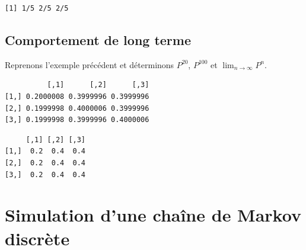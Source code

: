 \documentclass[
]{book}
\newenvironment{Shaded}{\begin{snugshade}}{\end{snugshade}}
\newcommand{\CommentTok}[1]{\textcolor[rgb]{0.56,0.35,0.01}{\textit{#1}}}
\newcommand{\DecValTok}[1]{\textcolor[rgb]{0.00,0.00,0.81}{#1}}
\newcommand{\KeywordTok}[1]{\textcolor[rgb]{0.13,0.29,0.53}{\textbf{#1}}}
\newcommand{\NormalTok}[1]{#1}
\newcommand{\OperatorTok}[1]{\textcolor[rgb]{0.81,0.36,0.00}{\textbf{#1}}}
\theoremstyle{definition}
\theoremstyle{definition}
\theoremstyle{definition}
\theoremstyle{remark}
\begin{document}
\begin{Shaded}
\end{Shaded}

\begin{verbatim}
[1] 1/5 2/5 2/5
\end{verbatim}

\hypertarget{comportement-de-long-terme}{%
\subsection{Comportement de long terme}\label{comportement-de-long-terme}}

Reprenons l'exemple précédent et déterminons \(P^{20}\), \(P^{100}\) et \(\displaystyle{\lim_{n \rightarrow \infty}}P^n\).

\begin{Shaded}
\end{Shaded}

\begin{verbatim}
          [,1]      [,2]      [,3]
[1,] 0.2000008 0.3999996 0.3999996
[2,] 0.1999998 0.4000006 0.3999996
[3,] 0.1999998 0.3999996 0.4000006
\end{verbatim}

\begin{Shaded}
\end{Shaded}

\begin{verbatim}
     [,1] [,2] [,3]
[1,]  0.2  0.4  0.4
[2,]  0.2  0.4  0.4
[3,]  0.2  0.4  0.4
\end{verbatim}

\hypertarget{simulation-dune-chauxeene-de-markov-discruxe8te}{%
\section{Simulation d'une chaîne de Markov discrète}\label{simulation-dune-chauxeene-de-markov-discruxe8te}}
\end{document}

